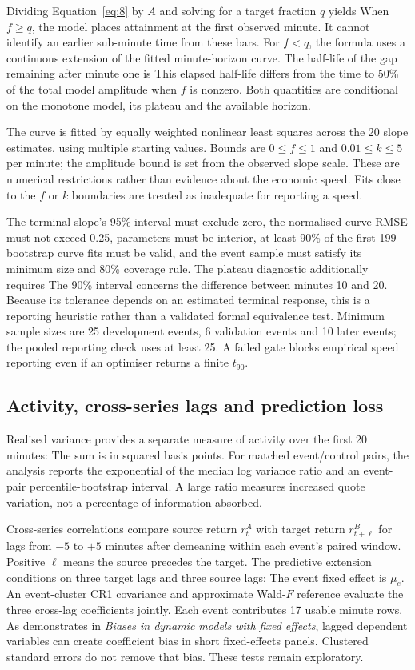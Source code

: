 Dividing Equation~\ref{eq:8} by $A$ and solving for a target fraction $q$ yields
When $f\geq q$, the model places attainment at the first observed minute. It cannot identify an earlier sub-minute time from these bars. For $f<q$, the formula uses a continuous extension of the fitted minute-horizon curve. The half-life of the gap remaining after minute one is
This elapsed half-life differs from the time to 50\% of the total model amplitude when $f$ is nonzero. Both quantities are conditional on the monotone model, its plateau and the available horizon.

The curve is fitted by equally weighted nonlinear least squares across the 20 slope estimates, using multiple starting values. Bounds are $0\leq f\leq1$ and $0.01\leq k\leq5$ per minute; the amplitude bound is set from the observed slope scale. These are numerical restrictions rather than evidence about the economic speed. Fits close to the $f$ or $k$ boundaries are treated as inadequate for reporting a speed.

The terminal slope's 95\% interval must exclude zero, the normalised curve RMSE must not exceed 0.25, parameters must be interior, at least 90\% of the first 199 bootstrap curve fits must be valid, and the event sample must satisfy its minimum size and 80\% coverage rule. The plateau diagnostic additionally requires
The 90\% interval concerns the difference between minutes 10 and 20. Because its tolerance depends on an estimated terminal response, this is a reporting heuristic rather than a validated formal equivalence test. Minimum sample sizes are 25 development events, 6 validation events and 10 later events; the pooled reporting check uses at least 25. A failed gate blocks empirical speed reporting even if an optimiser returns a finite $t_{90}$.

\subsection{Activity, cross-series lags and prediction loss}
Realised variance provides a separate measure of activity over the first 20 minutes:
The sum is in squared basis points. For matched event/control pairs, the analysis reports the exponential of the median log variance ratio and an event-pair percentile-bootstrap interval. A large ratio measures increased quote variation, not a percentage of information absorbed.

Cross-series correlations compare source return $r^A_t$ with target return $r^B_{t+\ell}$ for lags from $-5$ to $+5$ minutes after demeaning within each event's paired window. Positive $\ell$ means the source precedes the target. The predictive extension conditions on three target lags and three source lags:
The event fixed effect is $\mu_e$. An event-cluster CR1 covariance and approximate Wald-$F$ reference evaluate the three cross-lag coefficients jointly. Each event contributes 17 usable minute rows. As  demonstrates in \textit{Biases in dynamic models with fixed effects}, lagged dependent variables can create coefficient bias in short fixed-effects panels. Clustered standard errors do not remove that bias. These tests remain exploratory.

